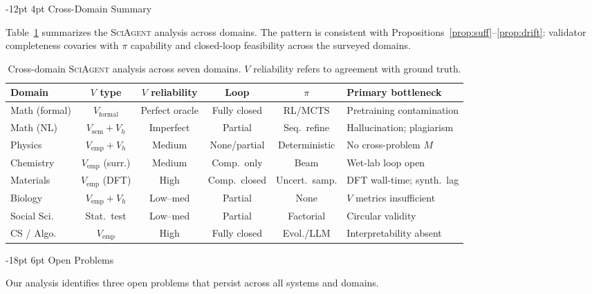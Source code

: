 \documentclass[11pt]{article}
\makeatletter
\renewcommand\section{\@startsection{section}{1}{\z@}%
  {-18pt \@plus -4pt \@minus -2pt}%
  {6pt \@plus 2pt}%
  {\normalfont\large\bfseries}}
\renewcommand\subsection{\@startsection{subsection}{2}{\z@}%
  {-12pt \@plus -2pt \@minus -2pt}%
  {4pt \@plus 1pt}%
  {\normalfont\normalsize\bfseries}}
\newcommand{\framework}{\textsc{SciAgent}}
\makeatother
\begin{document}
\subsection{Cross-Domain Summary}

Table~\ref{tab:domain-comparison} summarizes the \framework{} analysis across domains. The pattern is consistent with Propositions~\ref{prop:suff}--\ref{prop:drift}: validator completeness covaries with $\pi$ capability and closed-loop feasibility across the surveyed domains.

\begin{table}[h]
\centering
\small
\setlength{\tabcolsep}{4pt}
\begin{tabular}{@{}lccccp{2.6cm}@{}}
\toprule
Domain & $V$ type & $V$ reliability & Loop & $\pi$ & Primary bottleneck \\
\midrule
Math (formal) & $V_\text{formal}$ & Perfect oracle & Fully closed & RL/MCTS  & Pretraining contamination \\
Math (NL) & $V_\text{sem}+V_h$ & Imperfect & Partial & Seq.\ refine & Hallucination; plagiarism \\
Physics & $V_\text{emp}+V_h$ & Medium & None/partial & Deterministic & No cross-problem $M$ \\
Chemistry & $V_\text{emp}$ (surr.) & Medium & Comp.\ only & Beam & Wet-lab loop open \\
Materials & $V_\text{emp}$ (DFT) & High & Comp.\ closed & Uncert.\ samp. & DFT wall-time; synth.\ lag \\
Biology & $V_\text{emp}+V_h$ & Low--med & Partial & None & $V$ metrics insufficient \\
Social Sci. & Stat.\ test & Low--med & Partial & Factorial & Circular validity \\
CS / Algo. & $V_\text{emp}$ & High & Fully closed & Evol./LLM & Interpretability absent \\
\bottomrule
\end{tabular}
\caption{Cross-domain \framework{} analysis across seven domains. $V$ reliability refers to agreement with ground truth.}
\label{tab:domain-comparison}
\end{table}

\section{Open Problems}
\label{sec:openproblems}

Our analysis identifies three open problems that persist across all systems and domains.
\end{document}
